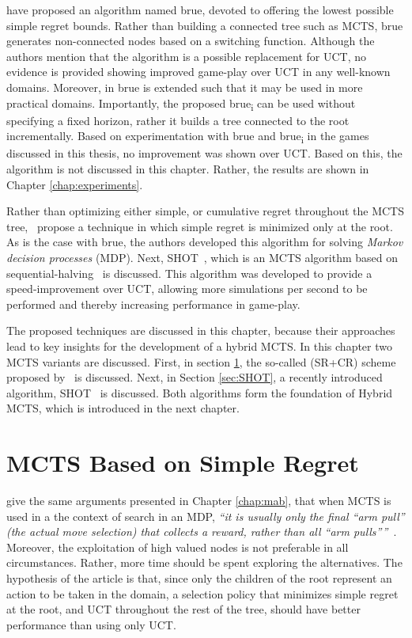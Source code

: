 \documentclass{kecsmstr}
\begin{document}
 have proposed an algorithm named {\sc brue}, devoted to offering the lowest possible simple regret bounds. Rather than building a connected tree such as MCTS, {\sc brue} generates non-connected nodes based on a switching function. Although the authors mention that the algorithm is a possible replacement for UCT, no evidence is provided showing improved game-play over UCT in any well-known domains. Moreover, in  {\sc brue} is extended such that it may be used in more practical domains. Importantly, the proposed {\sc brue\textsubscript{i}} can be used without specifying a fixed horizon, rather it builds a tree connected to the root incrementally. Based on experimentation with {\sc brue} and {\sc brue\textsubscript{i}} in the games discussed in this thesis, no improvement was shown over UCT. Based on this, the algorithm is not discussed in this chapter. Rather, the results are shown in Chapter \ref{chap:experiments}.

Rather than optimizing either simple, or cumulative regret throughout the MCTS tree,~ propose a technique in which simple regret is minimized only at the root. As is the case with {\sc brue}, the authors developed this algorithm for solving \emph{Markov decision processes} (MDP). Next, SHOT~, which is an MCTS algorithm based on sequential-halving~ is discussed. This algorithm was developed to provide a speed-improvement over UCT, allowing more simulations per second to be performed and thereby increasing performance in game-play. 

\vspace{2 mm}
The proposed techniques are discussed in this chapter, because their approaches lead to key insights for the development of a hybrid MCTS. In this chapter two MCTS variants are discussed. First, in section \ref{sec:srmcts}, the so-called (SR+CR) scheme proposed by~ is discussed. Next, in Section \ref{sec:SHOT}, a recently introduced algorithm, SHOT~ is discussed. Both algorithms form the foundation of Hybrid MCTS, which is introduced in the next chapter.
\newpage
\section{MCTS Based on Simple Regret}
\label{sec:srmcts}

 give the same arguments presented in Chapter \ref{chap:mab}, that when MCTS is used in a the context of search in an MDP, \emph{``it is usually only the final ``arm pull'' (the actual move selection) that collects a reward, rather than all ``arm pulls''''}~. Moreover, the exploitation of high valued nodes is not preferable in all circumstances. Rather, more time should be spent exploring the alternatives. The hypothesis of the article is that, since only the children of the root represent an action to be taken in the domain, a selection policy that minimizes simple regret at the root, and UCT throughout the rest of the tree, should have better performance than using only UCT.
\end{document}
